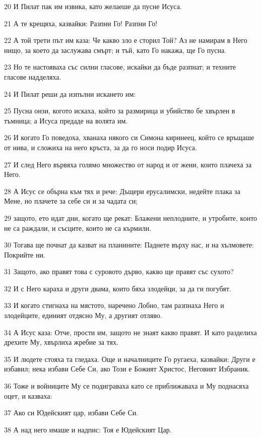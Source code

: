 \par 20 И Пилат пак им извика, като желаеше да пусне Исуса.
\par 21 А те крещяха, казвайки: Разпни Го! Разпни Го!
\par 22 А той трети път им каза: Че какво зло е сторил Той? Аз не намирам в Него нищо, за което да заслужава смърт; и тъй, като Го накажа, ще Го пусна.
\par 23 Но те настояваха със силни гласове, искайки да бъде разпнат; и техните гласове надделяха.
\par 24 И Пилат реши да изпълни искането им:
\par 25 Пусна онзи, когото искаха, който за размирица и убийство бе хвърлен в тъмница; а Исуса предаде на волята им.
\par 26 И когато Го поведоха, хванаха някого си Симона киринеец, който се връщаше от нива, и сложиха на него кръста, за да го носи подир Исуса.
\par 27 И след Него вървяха голямо множество от народ и от жени, които плачеха за Него.
\par 28 А Исус се обърна към тях и рече: Дъщери ерусалимски, недейте плака за Мене, но плачете за себе си и за чадата си;
\par 29 защото, ето идат дни, когато ще рекат: Блажени неплодните, и утробите, които не са раждали, и съсците, които не са кърмили.
\par 30 Тогава ще почнат да казват на планините: Паднете върху нас, и на хълмовете: Покрийте ни.
\par 31 Защото, ако правят това с суровото дърво, какво ще правят със сухото?
\par 32 И с Него караха и други двама, които бяха злодейци, за да ги погубят.
\par 33 И когато стигнаха на мястото, наречено Лобно, там разпнаха Него и злодейците, единият отдясно Му, а другият отляво.
\par 34 А Исус каза: Отче, прости им, защото не знаят какво правят. И като разделиха дрехите Му, хвърлиха жребие за тях.
\par 35 И людете стояха та гледаха. Още и началниците Го ругаеха, казвайки: Други е избавил; нека избави Себе Си, ако Този е Божият Христос, Неговият Избраник.
\par 36 Тоже и войниците Му се подиграваха като се приближаваха и Му поднасяха оцет, и казваха:
\par 37 Ако си Юдейският цар, избави Себе Си.
\par 38 А над него имаше и надпис: Тоя е Юдейският Цар.
